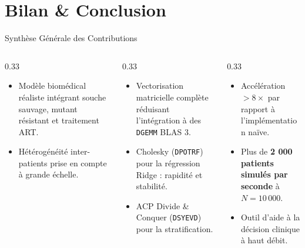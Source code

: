 \documentclass[aspectratio=169, 10pt, french]{beamer}
\begin{document}
\section{Bilan \& Conclusion}
\begin{frame}{Synthèse Générale des Contributions}
    \begin{columns}[t]
        \begin{column}{0.33\textwidth}
            \begin{cadreconcept}
                \footnotesize
                \begin{itemize}
                    \item Modèle biomédical réaliste intégrant souche sauvage, mutant résistant et traitement ART.
                    \item Hétérogénéité inter-patients prise en compte à grande échelle.
                \end{itemize}
            \end{cadreconcept}
        \end{column}

        \begin{column}{0.33\textwidth}
            \begin{cadrehpc}
                \footnotesize
                \begin{itemize}
                    \item Vectorisation matricielle complète réduisant l'intégration à des \texttt{DGEMM} BLAS 3.
                    \item Cholesky (\texttt{DPOTRF}) pour la régression Ridge : rapidité et stabilité.
                    \item ACP Divide \& Conquer (\texttt{DSYEVD}) pour la stratification.
                \end{itemize}
            \end{cadrehpc}
        \end{column}

        \begin{column}{0.33\textwidth}
            \begin{cadreclinique}
                \footnotesize
                \begin{itemize}
                    \item Accélération $> 8\times$ par rapport à l'implémentation naïve.
                    \item Plus de \textbf{2 000 patients simulés par seconde} à $N = 10\,000$.
                    \item Outil d'aide à la décision clinique à haut débit.
                \end{itemize}
            \end{cadreclinique}
        \end{column}
    \end{columns}


\end{frame}
\end{document}
